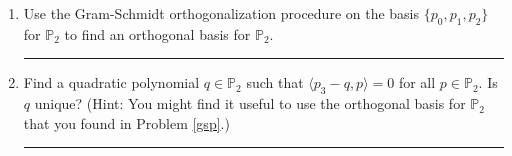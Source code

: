 \documentclass[12pt]{amsart}
\newcommand{\1}{\mathbbm{1}}
\numberwithin{equation}{section}
\numberwithin{Theorem}{section}
\theoremstyle{plain} %
\theoremstyle{definition}
\theoremstyle{remark}
\begin{document}
\begin{enumerate}[1.]
\begin{enumerate}[(a)]
\begin{proof}
		\begin{align*}
			c_1\mathbf{e}_1+c_2\mathbf{e}_2
			&= c_1\mathbf{v}_1+c_2\left( \mathbf{v}_2 - \frac{\langle\mathbf{e}_1,\mathbf{v}_2\rangle}{\|\mathbf{e}_1\|^2}\mathbf{e}_1 \right) \\
			&= c_1\mathbf{v}_1- c_2\left( \frac{\langle\mathbf{e}_1,\mathbf{v}_2\rangle}{\|\mathbf{e}_1\|^2}\mathbf{e}_1 \right) + c_2\mathbf{v}_2 \\
			&= c_1\mathbf{v}_1- c_2\left( \frac{\langle\mathbf{e}_1,\mathbf{v}_2\rangle}{\|\mathbf{e}_1\|^2}\mathbf{e}_1 \right) + c_2\mathbf{v}_2 \\
			&= c_1\mathbf{v}_1- c_2\left( \frac{\langle\mathbf{e}_1,\mathbf{v}_2\rangle}{\|\mathbf{e}_1\|^2}\mathbf{v}_1 \right) + c_2\mathbf{v}_2 \\
			&= \left(c_1- c_2 \frac{\langle\mathbf{e}_1,\mathbf{v}_2\rangle}{\|\mathbf{e}_1\|^2} \right)\mathbf{v}_1 + c_2\mathbf{v}_2.
		\end{align*}
		Thus \(\operatorname{span}\{\mathbf{e}_{1},\mathbf{e}_{2}\} \subset  \operatorname{span}\{\mathbf{v}_{1},\mathbf{v}_{2}\}\). Because both spans include the other we can conclude \(\operatorname{span}\{\mathbf{e}_{1},\mathbf{e}_{2}\} = \operatorname{span}\{\mathbf{v}_{1},\mathbf{v}_{2}\}\).
	\end{proof}


\end{enumerate}



\item\label{gsp} Use the Gram-Schmidt orthogonalization procedure on the basis \(\{p_{0},p_{1},p_{2}\}\) for \(\mathbb{P}_{2}\) to find an orthogonal basis for \(\mathbb{P}_{2}\).\bigskip

\hrule
\bigskip



\item Find a quadratic polynomial \(q\in\mathbb{P}_{2}\) such that \(\langle p_{3}-q,p\rangle = 0\) for all \(p\in\mathbb{P}_{2}\). Is \(q\) unique? (Hint: You might find it useful to use the orthogonal basis for \(\mathbb{P}_{2}\) that you found in Problem \ref{gsp}.) \bigskip

\hrule
\bigskip



\end{enumerate}
\end{document}
